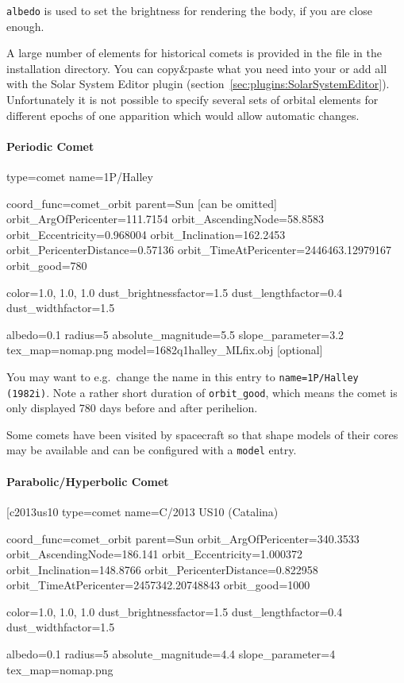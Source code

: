 \texttt{albedo} is used to set the brightness for rendering the body,
if you are close enough. 

A large number of elements for historical comets is provided in the
file  in the installation directory. You
can copy\&paste what you need into your
 or add all with the Solar System Editor plugin (section~\ref{sec:plugins:SolarSystemEditor}). 
Unfortunately it is not possible to specify
several sets of orbital elements for different epochs of one apparition which would
allow automatic changes.

\paragraph{Periodic Comet}
\label{sec:ssystem.ini:Comet:Periodic}

\begin{configfile}
[1phalley]
type=comet  
name=1P/Halley

coord_func=comet_orbit
parent=Sun [can be omitted]
orbit_ArgOfPericenter=111.7154
orbit_AscendingNode=58.8583
orbit_Eccentricity=0.968004
orbit_Inclination=162.2453
orbit_PericenterDistance=0.57136
orbit_TimeAtPericenter=2446463.12979167
orbit_good=780

color=1.0, 1.0, 1.0
dust_brightnessfactor=1.5
dust_lengthfactor=0.4
dust_widthfactor=1.5

albedo=0.1
radius=5
absolute_magnitude=5.5
slope_parameter=3.2
tex_map=nomap.png
model=1682q1halley_MLfix.obj [optional]
\end{configfile}

You may want to e.g.\ change the name in this entry
to \texttt{name=1P/Halley (1982i)}. Note a rather short
duration of \texttt{orbit\_good}, which means the comet is only displayed 780
days before and after perihelion.

Some comets have been visited by spacecraft so that shape models of their cores 
may be available and can be configured with a \texttt{model} entry.

\paragraph{Parabolic/Hyperbolic Comet}
\label{sec:ssystem.ini:Comet:Parabolic}

\begin{configfile}
[c2013us10%
type=comet
name=C/2013 US10 (Catalina)

coord_func=comet_orbit
parent=Sun 
orbit_ArgOfPericenter=340.3533
orbit_AscendingNode=186.141
orbit_Eccentricity=1.000372
orbit_Inclination=148.8766
orbit_PericenterDistance=0.822958
orbit_TimeAtPericenter=2457342.20748843
orbit_good=1000

color=1.0, 1.0, 1.0
dust_brightnessfactor=1.5
dust_lengthfactor=0.4
dust_widthfactor=1.5

albedo=0.1
radius=5
absolute_magnitude=4.4
slope_parameter=4
tex_map=nomap.png
\end{configfile}

